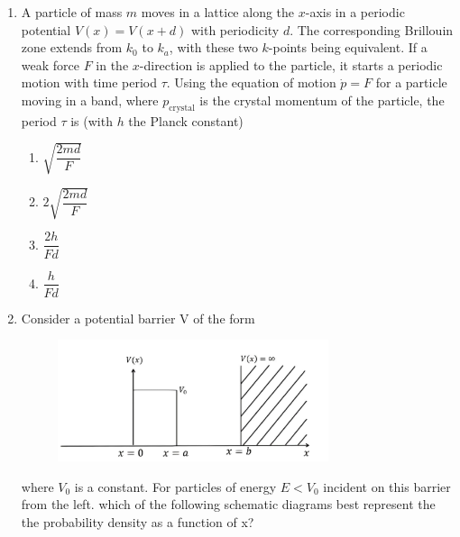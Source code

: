 \documentclass[journal,12pt,onecolumn]{IEEEtran}
\begin{document}
\begin{enumerate}[itemsep=0.45cm]
 \item A particle of mass $m$ moves in a lattice along the $x$-axis in a periodic potential $V(x)=V(x+d)$ with periodicity $d$. The corresponding Brillouin zone extends from $k_0$ to $k_a$, with these two $k$-points being equivalent. If a weak force $F$ in the $x$-direction is applied to the particle, it starts a periodic motion with time period $\tau$. Using the equation of motion $\dot{p}=F$ for a particle moving in a band, where $p_\text{crystal}$ is the crystal momentum of the particle, the period $\tau$ is (with $h$ the Planck constant)

 \hfill{}

    \begin{multicols}{2}
    \begin{enumerate}
        \item $\sqrt{\dfrac{2md}{F}}$
        \item $2\sqrt{\dfrac{2md}{F}}$
        \item $\dfrac{2h}{Fd}$
        \item $\dfrac{h}{Fd}$
    \end{enumerate}
    \end{multicols}

\newpage

\item Consider a potential barrier V of the form


\begin{figure}[ht!]
    \centering
    \includegraphics[width=0.75\textwidth]{fig3.jpeg}
    \caption{}
    \label{fig:fig3.jpeg}
\end{figure}

where $V_0$ is a constant. For particles of energy $E<V_0$ incident on this barrier from the left. which of the following schematic diagrams best represent the the probability density as a function of x?

\hfill{}


\end{enumerate}
\end{document}
